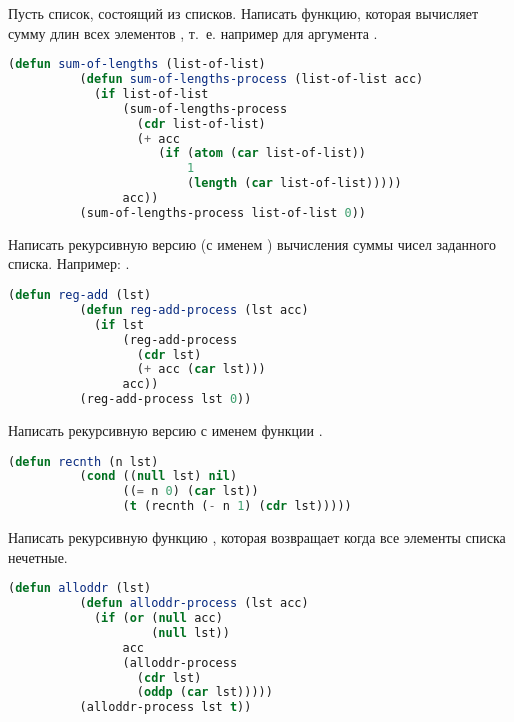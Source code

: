 \documentclass[a4paper,oneside,12pt]{extreport}
\begin{document}


\begin{task}
	Пусть  список, состоящий из списков.
	Написать функцию, которая вычисляет сумму длин всех элементов , т.~е. например для аргумента .

	\begin{lstlisting}[language=Lisp, gobble=16]
		(defun sum-of-lengths (list-of-list)
		  (defun sum-of-lengths-process (list-of-list acc)
		    (if list-of-list
		        (sum-of-lengths-process
		          (cdr list-of-list)
		          (+ acc
		             (if (atom (car list-of-list))
		                 1
		                 (length (car list-of-list)))))
		        acc))
		  (sum-of-lengths-process list-of-list 0))
	\end{lstlisting}
\end{task}

\begin{task}
	Написать рекурсивную версию (с именем ) вычисления суммы чисел заданного списка.
	Например: .

	\begin{lstlisting}[language=Lisp, gobble=16]
		(defun reg-add (lst)
		  (defun reg-add-process (lst acc)
		    (if lst
		        (reg-add-process
		          (cdr lst)
		          (+ acc (car lst)))
		        acc))
		  (reg-add-process lst 0))
	\end{lstlisting}
\end{task}

\begin{task}
	Написать рекурсивную версию с именем  функции .

	\begin{lstlisting}[language=Lisp, gobble=16]
		(defun recnth (n lst)
		  (cond ((null lst) nil)
		        ((= n 0) (car lst))
		        (t (recnth (- n 1) (cdr lst)))))
	\end{lstlisting}
\end{task}

\begin{task}
	Написать рекурсивную функцию , которая возвращает  когда все элементы списка нечетные.

	\begin{lstlisting}[language=Lisp, gobble=16]
		(defun alloddr (lst)
		  (defun alloddr-process (lst acc)
		    (if (or (null acc)
		            (null lst))
		        acc
		        (alloddr-process
		          (cdr lst)
		          (oddp (car lst)))))
		  (alloddr-process lst t))
	\end{lstlisting}
\end{task}
\end{document}
